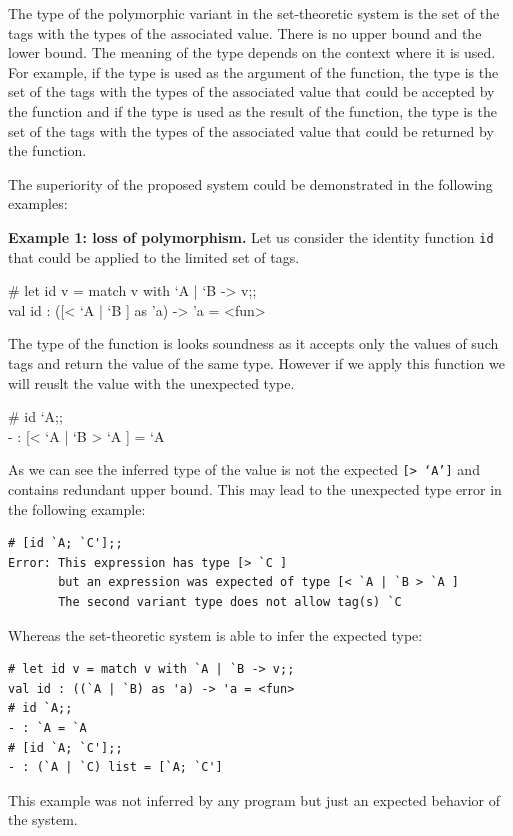\documentclass[a4paper,11pt,oneside]{article}
\theoremstyle{definition}
\begin{document}
The type of the polymorphic variant in the set-theoretic system is the set of the tags with the types of the associated value. There is no upper bound and the lower bound. The meaning of the type depends on the context where it is used. For example, if the type is used as the argument of the function, the type is the set of the tags with the types of the associated value that could be accepted by the function and if the type is used as the result of the function, the type is the set of the tags with the types of the associated value that could be returned by the function.

The superiority of the proposed system could be demonstrated in the following examples:

\textbf{Example 1: loss of polymorphism.} Let us consider the identity function \texttt{id} that could be applied to the limited set of tags.

  {\ttfamily
    \# let id v = match v with `A | `B -> v;; \\
    val id : ([< `A | `B ] as 'a) -> 'a = <fun>
  }

The type of the function is looks soundness as it accepts only the values of such tags and return the value of the same type. However if we apply this function we will reuslt the value with the unexpected type.

{\ttfamily
\# id `A;; \\
- : [< `A | `B > `A ] = `A
}

As we can see the inferred type of the value is not the expected \texttt{[> `A']} and contains redundant upper bound. This may lead to the unexpected type error in the following example:

{\ttfamily\begin{verbatim}
# [id `A; `C'];;
Error: This expression has type [> `C ]
       but an expression was expected of type [< `A | `B > `A ]
       The second variant type does not allow tag(s) `C
\end{verbatim}}

Whereas the set-theoretic system is able to infer the expected type:

{\ttfamily\begin{verbatim}
# let id v = match v with `A | `B -> v;;
val id : ((`A | `B) as 'a) -> 'a = <fun>
# id `A;;
- : `A = `A
# [id `A; `C'];;
- : (`A | `C) list = [`A; `C']
\end{verbatim}}

This example was not inferred by any program but just an expected behavior of the system.
\end{document}
